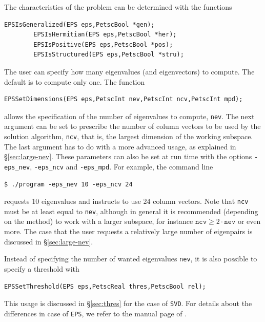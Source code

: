 The characteristics of the problem can be determined with the functions
           
        \begin{Verbatim}[fontsize=\small]
        EPSIsGeneralized(EPS eps,PetscBool *gen);
        EPSIsHermitian(EPS eps,PetscBool *her);
        EPSIsPositive(EPS eps,PetscBool *pos);
        EPSIsStructured(EPS eps,PetscBool *stru);
        \end{Verbatim}

The user can specify how many eigenvalues (and eigenvectors) to compute. The default is to compute only one. The function
        \begin{Verbatim}[fontsize=\small]
        EPSSetDimensions(EPS eps,PetscInt nev,PetscInt ncv,PetscInt mpd);
        \end{Verbatim}
allows the specification of the number of eigenvalues to compute, \texttt{nev}. The next argument can be set to prescribe the number of column vectors to be used by the solution algorithm, \texttt{ncv}, that is, the largest dimension of the working subspace. The last argument has to do with a more advanced usage, as explained in \S\ref{sec:large-nev}. These parameters can also be set at run time with the options \Verb!-eps_nev!, \Verb!-eps_ncv! and \Verb!-eps_mpd!. For example, the command line
\begin{Verbatim}[fontsize=\small]
        $ ./program -eps_nev 10 -eps_ncv 24
\end{Verbatim}
requests 10 eigenvalues and instructs to use 24 column vectors. Note that \texttt{ncv} must be at least equal to \texttt{nev}, although in general it is recommended (depending on the method) to work with a larger subspace, for instance $\mathtt{ncv}\geq2\cdot\mathtt{nev}$ or even more. The case that the user requests a relatively large number of eigenpairs is discussed in \S\ref{sec:large-nev}.

Instead of specifying the number of wanted eigenvalues \texttt{nev}, it is also possible to specify a threshold with
        \begin{Verbatim}[fontsize=\small]
        EPSSetThreshold(EPS eps,PetscReal thres,PetscBool rel);
        \end{Verbatim}
This usage is discussed in \S\ref{sec:thres} for the case of \texttt{SVD}. For details about the differences in case of \texttt{EPS}, we refer to the manual page of .

